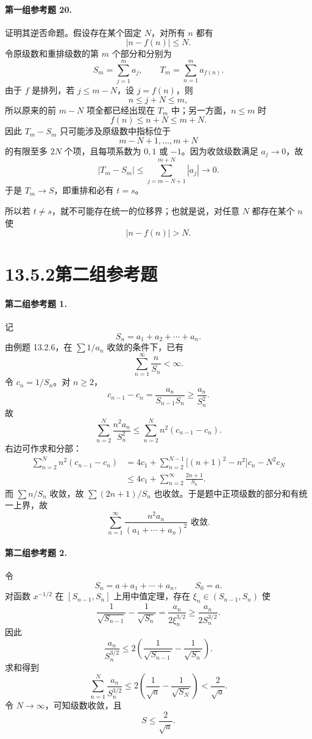 \paragraph{第一组参考题 20.}
\begin{xsolution}
证明其逆否命题。假设存在某个固定 $N$，对所有 $n$ 都有
\[
 |n-f(n)|\leq N.
\]
令原级数和重排级数的第 $m$ 个部分和分别为
\[
 S_m=\sum_{j=1}^{m}a_j,
 \qquad
 T_m=\sum_{n=1}^{m}a_{f(n)}.
\]
由于 $f$ 是排列，若 $j\leq m-N$，设 $j=f(n)$，则
\[
 n\leq j+N\leq m,
\]
所以原来的前 $m-N$ 项全都已经出现在 $T_m$ 中；另一方面，$n\leq m$ 时
\[
 f(n)\leq n+N\leq m+N.
\]
因此 $T_m-S_m$ 只可能涉及原级数中指标位于
\[
 m-N+1,\ldots,m+N
\]
的有限至多 $2N$ 个项，且每项系数为 $0,1$ 或 $-1$。因为收敛级数满足 $a_j\to0$，故
\[
 |T_m-S_m|\leq\sum_{j=m-N+1}^{m+N}|a_j|\longrightarrow0.
\]
于是 $T_m\to S$，即重排和必有 $t=s$。

所以若 $t\neq s$，就不可能存在统一的位移界；也就是说，对任意 $N$ 都存在某个 $n$ 使
\[
 \boxed{|n-f(n)|>N}.
\]
\end{xsolution}

\section*{13.5.2\quad 第二组参考题}

\paragraph{第二组参考题 1.}
\begin{xsolution}
记
\[
 S_n=a_1+a_2+\cdots+a_n.
\]
由例题 13.2.6，在 $\sum1/a_n$ 收敛的条件下，已有
\[
 \sum_{n=1}^{\infty}\frac{n}{S_n}<\infty.
\]
令 $c_n=1/S_n$。对 $n\geq2$，
\[
 c_{n-1}-c_n
 =\frac{a_n}{S_{n-1}S_n}
 \geq\frac{a_n}{S_n^2}.
\]
故
\[
 \sum_{n=2}^{N}\frac{n^2a_n}{S_n^2}
 \leq\sum_{n=2}^{N}n^2(c_{n-1}-c_n).
\]
右边可作求和分部：
\[
 \begin{aligned}
 \sum_{n=2}^{N}n^2(c_{n-1}-c_n)
 &=4c_1+\sum_{n=2}^{N-1}\bigl[(n+1)^2-n^2\bigr]c_n-N^2c_N\\
 &\leq4c_1+\sum_{n=2}^{\infty}\frac{2n+1}{S_n}.
\end{aligned}
\]
而 $\sum n/S_n$ 收敛，故 $\sum(2n+1)/S_n$ 也收敛。于是题中正项级数的部分和有统一上界，故
\[
 \boxed{\sum_{n=1}^{\infty}\frac{n^2a_n}{(a_1+\cdots+a_n)^2}\text{ 收敛}.}
\]
\end{xsolution}

\paragraph{第二组参考题 2.}
\begin{xsolution}
令
\[
 S_n=a+a_1+\cdots+a_n,
 \qquad S_0=a.
\]
对函数 $x^{-1/2}$ 在 $[S_{n-1},S_n]$ 上用中值定理，存在 $\xi_n\in(S_{n-1},S_n)$ 使
\[
 \frac1{\sqrt{S_{n-1}}}-\frac1{\sqrt{S_n}}
 =\frac{a_n}{2\xi_n^{3/2}}
 \geq\frac{a_n}{2S_n^{3/2}}.
\]
因此
\[
 \frac{a_n}{S_n^{3/2}}
 \leq2\left(\frac1{\sqrt{S_{n-1}}}-\frac1{\sqrt{S_n}}\right).
\]
求和得到
\[
 \sum_{n=1}^{N}\frac{a_n}{S_n^{3/2}}
 \leq2\left(\frac1{\sqrt a}-\frac1{\sqrt{S_N}}\right)
 <\frac2{\sqrt a}.
\]
令 $N\to\infty$，可知级数收敛，且
\[
 \boxed{S\leq\frac2{\sqrt a}}.
\]
\end{xsolution}


